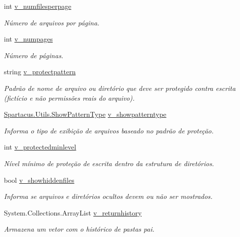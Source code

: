 \begin{DoxyCompactItemize}
int \hyperlink{classSpartacus_1_1Utils_1_1FileExplorer_abbf2deab4665a8be42c23393bdbf54df}{v\+\_\+numfilesperpage}
\begin{DoxyCompactList}\small\item\em Número de arquivos por página. \end{DoxyCompactList}\item 
int \hyperlink{classSpartacus_1_1Utils_1_1FileExplorer_a8017af938b655e57eb51eb83fba48ed6}{v\+\_\+numpages}
\begin{DoxyCompactList}\small\item\em Número de páginas. \end{DoxyCompactList}\item 
string \hyperlink{classSpartacus_1_1Utils_1_1FileExplorer_a1e0f31dd0c66b2a6d5003a0ace555eab}{v\+\_\+protectpattern}
\begin{DoxyCompactList}\small\item\em Padrão de nome de arquivo ou diretório que deve ser protegido contra escrita (fictício e não permissões reais do arquivo). \end{DoxyCompactList}\item 
\hyperlink{namespaceSpartacus_1_1Utils_a39dc52f76b36470069f38f3e8b1cd73e}{Spartacus.\+Utils.\+Show\+Pattern\+Type} \hyperlink{classSpartacus_1_1Utils_1_1FileExplorer_af5b66d2bdb32bac1793c470e913546b6}{v\+\_\+showpatterntype}
\begin{DoxyCompactList}\small\item\em Informa o tipo de exibição de arquivos baseado no padrão de proteção. \end{DoxyCompactList}\item 
int \hyperlink{classSpartacus_1_1Utils_1_1FileExplorer_a471c35d5854d9f4dbf605da187f262b1}{v\+\_\+protectedminlevel}
\begin{DoxyCompactList}\small\item\em Nível mínimo de proteção de escrita dentro da estrutura de diretórios. \end{DoxyCompactList}\item 
bool \hyperlink{classSpartacus_1_1Utils_1_1FileExplorer_ac0811882d93d76fb122f8aad7ec7b15d}{v\+\_\+showhiddenfiles}
\begin{DoxyCompactList}\small\item\em Informa se arquivos e diretórios ocultos devem ou não ser mostrados. \end{DoxyCompactList}\item 
System.\+Collections.\+Array\+List \hyperlink{classSpartacus_1_1Utils_1_1FileExplorer_a0b1ce7d97438abd5824a0b6b9b99bc34}{v\+\_\+returnhistory}
\begin{DoxyCompactList}\small\item\em Armazena um vetor com o histórico de pastas pai. \end{DoxyCompactList}\end{DoxyCompactItemize}


